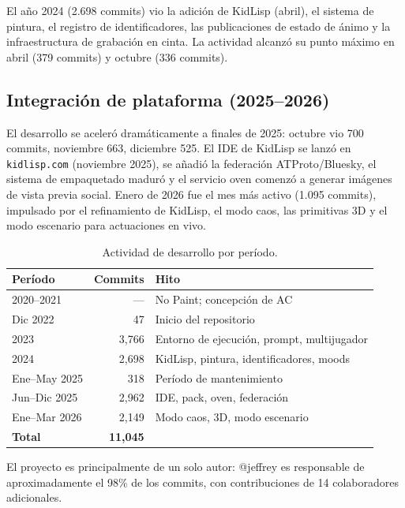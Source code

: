 \documentclass[10pt,letterpaper,twocolumn]{article}
\begin{document}
El año 2024 (2.698 commits) vio la adición de KidLisp (abril), el sistema de pintura, el registro de identificadores, las publicaciones de estado de ánimo y la infraestructura de grabación en cinta. La actividad alcanzó su punto máximo en abril (379 commits) y octubre (336 commits).

\subsection{Integración de plataforma (2025--2026)}

El desarrollo se aceleró dramáticamente a finales de 2025: octubre vio 700 commits, noviembre 663, diciembre 525. El IDE de KidLisp se lanzó en \texttt{kidlisp.com} (noviembre 2025), se añadió la federación ATProto/Bluesky, el sistema de empaquetado maduró y el servicio oven comenzó a generar imágenes de vista previa social. Enero de 2026 fue el mes más activo (1.095 commits), impulsado por el refinamiento de KidLisp, el modo caos, las primitivas 3D y el modo escenario para actuaciones en vivo.

\begin{table}[h]
\small
\centering
\begin{tabular}{lrl}
\toprule
\textbf{Período} & \textbf{Commits} & \textbf{Hito} \\
\midrule
2020--2021 & --- & No Paint; concepción de AC \\
Dic 2022 & 47 & Inicio del repositorio \\
2023 & 3{,}766 & Entorno de ejecución, prompt, multijugador \\
2024 & 2{,}698 & KidLisp, pintura, identificadores, moods \\
Ene--May 2025 & 318 & Período de mantenimiento \\
Jun--Dic 2025 & 2{,}962 & IDE, pack, oven, federación \\
Ene--Mar 2026 & 2{,}149 & Modo caos, 3D, modo escenario \\
\midrule
\textbf{Total} & \textbf{11{,}045} & \\
\bottomrule
\end{tabular}
\caption{Actividad de desarrollo por período.}
\label{tab:history}
\end{table}

El proyecto es principalmente de un solo autor: @jeffrey es responsable de aproximadamente el 98\% de los commits, con contribuciones de 14 colaboradores adicionales.

\end{document}

